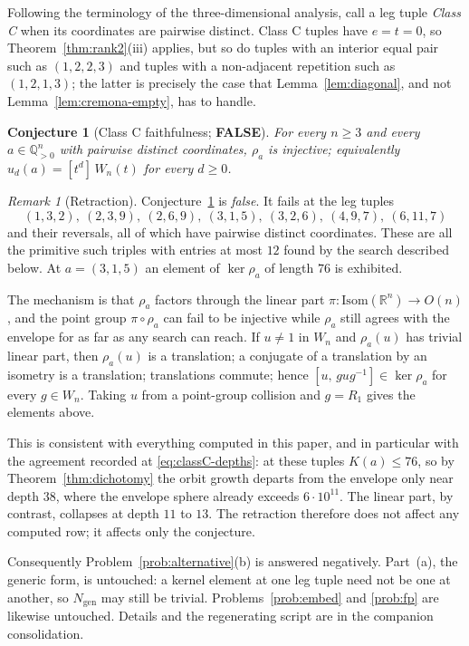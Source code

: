 \documentclass[11pt,a4paper]{article}
\newcommand{\R}{\mathbb{R}}
\newcommand{\Q}{\mathbb{Q}}
\newcommand{\Isom}{\mathrm{Isom}}
\newtheorem{conjecture}[theorem]{Conjecture}
\theoremstyle{definition}
\theoremstyle{remark}
\newtheorem{remark}[theorem]{Remark}
\theoremstyle{plain}
\begin{document}
Following the terminology of the three-dimensional analysis, call a leg tuple \emph{Class C}
when its coordinates are pairwise distinct. Class C tuples have $e=t=0$, so
Theorem~\ref{thm:rank2}(iii) applies, but so do tuples with an interior equal pair such as
$(1,2,2,3)$ and tuples with a non-adjacent repetition such as $(1,2,1,3)$; the latter is
precisely the case that Lemma~\ref{lem:diagonal}, and not Lemma~\ref{lem:cremona-empty}, has to
handle.

\begin{conjecture}[Class C faithfulness; \textbf{FALSE}]\label{conj:master-C}
For every $n\ge3$ and every $a\in\Q_{>0}^n$ with pairwise distinct coordinates, $\rho_a$ is
injective; equivalently $u_d(a)=[t^d]\,W_n(t)$ for every $d\ge0$.
\end{conjecture}

\begin{remark}[Retraction]\label{rem:masterC-false}
Conjecture~\ref{conj:master-C} is \emph{false}. It fails at the leg tuples
\[
 (1,3,2),\ (2,3,9),\ (2,6,9),\ (3,1,5),\ (3,2,6),\ (4,9,7),\ (6,11,7)
\]
and their reversals, all of which have pairwise distinct coordinates. These are all the
primitive such triples with entries at most $12$ found by the search described below. At
$a=(3,1,5)$ an element of $\ker\rho_a$ of length $76$ is exhibited.

The mechanism is that $\rho_a$ factors through the linear part
$\pi\colon\Isom(\R^n)\to O(n)$, and the point group $\pi\circ\rho_a$ can fail to be injective
while $\rho_a$ still agrees with the envelope for as far as any search can reach. If $u\ne1$ in
$W_n$ and $\rho_a(u)$ has trivial linear part, then $\rho_a(u)$ is a translation; a conjugate of
a translation by an isometry is a translation; translations commute; hence
$[u,\,gug^{-1}]\in\ker\rho_a$ for every $g\in W_n$. Taking $u$ from a point-group collision and
$g=R_1$ gives the elements above.

This is consistent with everything computed in this paper, and in particular with the agreement
recorded at \eqref{eq:classC-depths}: at these tuples $K(a)\le76$, so by
Theorem~\ref{thm:dichotomy} the orbit growth departs from the envelope only near depth $38$,
where the envelope sphere already exceeds $6\cdot10^{11}$. The linear part, by contrast,
collapses at depth $11$ to $13$. The retraction therefore does not affect any computed row; it
affects only the conjecture.

Consequently Problem~\ref{prob:alternative}(b) is answered negatively. Part~(a), the generic
form, is untouched: a kernel element at one leg tuple need not be one at another, so
$N_{\mathrm{gen}}$ may still be trivial. Problems~\ref{prob:embed} and \ref{prob:fp} are
likewise untouched. Details and the regenerating script are in the companion consolidation.
\end{remark}
\end{document}
